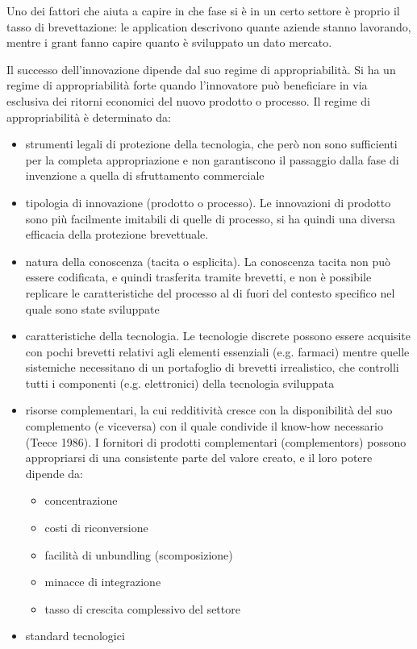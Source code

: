 \documentclass[answers, a4paper, 11pt]{exam}
\begin{document}
Uno dei fattori che aiuta a capire in che fase si è in un certo settore è proprio il tasso di brevettazione: le application descrivono quante aziende stanno lavorando, mentre i grant fanno capire quanto è sviluppato un dato mercato.

Il successo dell'innovazione dipende dal suo regime di appropriabilità. Si ha un regime di appropriabilità forte quando l'innovatore può beneficiare in via esclusiva dei ritorni economici del nuovo prodotto o processo. Il regime di appropriabilità è determinato da:

\begin{itemize}
    \item strumenti legali di protezione della tecnologia, che però non sono sufficienti per la completa appropriazione e non garantiscono il passaggio dalla fase di invenzione a quella di sfruttamento commerciale
    \item tipologia di innovazione (prodotto o processo). Le innovazioni di prodotto sono più facilmente imitabili di quelle di processo, si ha quindi una diversa efficacia della protezione brevettuale.
    \item natura della conoscenza (tacita o esplicita). La conoscenza tacita non può essere codificata, e quindi trasferita tramite brevetti, e non è possibile replicare le caratteristiche del processo al di fuori del contesto specifico nel quale sono state sviluppate
    \item caratteristiche della tecnologia. Le tecnologie discrete possono essere acquisite con pochi brevetti relativi agli elementi essenziali (e.g. farmaci) mentre quelle sistemiche necessitano di un portafoglio di brevetti irrealistico, che controlli tutti i componenti (e.g. elettronici) della tecnologia sviluppata
    \item risorse complementari, la cui redditività cresce con la disponibilità del suo complemento (e viceversa) con il quale condivide il know-how necessario (Teece 1986). I fornitori di prodotti complementari (complementors) possono appropriarsi di una consistente parte del valore creato, e il loro potere dipende da:
    \begin{itemize}
        \item concentrazione
        \item costi di riconversione
        \item facilità di unbundling (scomposizione)
        \item minacce di integrazione
        \item tasso di crescita complessivo del settore
    \end{itemize}
    \item standard tecnologici
\end{itemize}
\end{document}
